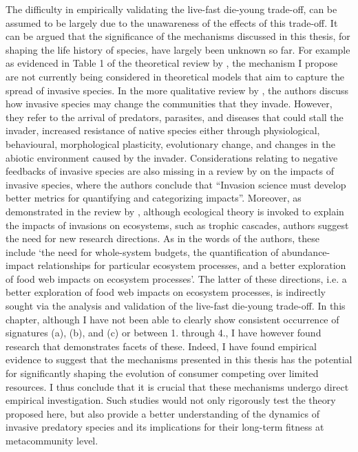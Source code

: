 \documentclass[a4paper]{report}
\begin{document}
 The difficulty in empirically validating the live-fast die-young trade-off, can be assumed to be largely due to the unawareness of the effects of this trade-off. It can be argued that the significance of the mechanisms discussed in this thesis, for shaping the life history of species, have largely been unknown so far. For example as evidenced in Table 1 of the theoretical review by \citep{Hastings2005}, the mechanism I propose are not currently being considered in theoretical models that aim to capture the spread of invasive species. In the more qualitative review by \citep{Strayer2006}, the authors discuss how invasive species may change the communities that they invade. However, they refer to the arrival of predators, parasites, and diseases that could stall the invader, increased resistance of native species either through physiological, behavioural, morphological plasticity, evolutionary change, and changes in the abiotic environment caused by the invader. Considerations relating to negative feedbacks of invasive species are also missing in a review by \citep{Simberloff2013} on the impacts of invasive species, where the authors conclude that “Invasion science must develop better metrics for quantifying and categorizing impacts”. Moreover, as demonstrated in the review by \citep{Ehrenfeld2010}, although ecological theory is invoked to explain the impacts of invasions on ecosystems, such as trophic cascades, authors suggest the need for new research directions. As in the words of the authors, these include ‘the need for whole-system budgets, the quantification of abundance-impact relationships for particular ecosystem processes, and a better exploration of food web impacts on ecosystem processes’. The latter of these directions, i.e. a better exploration of food web impacts on ecosystem processes, is indirectly sought via the analysis and validation of the live-fast die-young trade-off. In this chapter, although I have not been able to clearly show consistent occurrence of signatures (a), (b), and (c) or between 1. through 4., I have however found research that demonstrates facets of these. Indeed, I have found empirical evidence to suggest that the mechanisms presented in this thesis has the potential for significantly shaping the evolution of consumer competing over limited resources. I thus conclude that it is crucial that these mechanisms undergo direct empirical investigation. Such studies would not only rigorously test the theory proposed here, but also provide a better understanding of the dynamics of invasive predatory species and its implications for their long-term fitness at metacommunity level.\\
\end{document}
